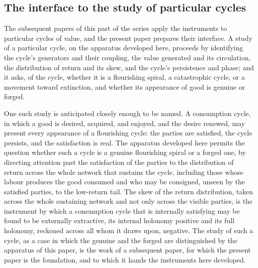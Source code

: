 \subsection{The interface to the study of particular cycles}
\label{p11:sec:found-interface}

The subsequent papers of this part of the series apply the instruments to particular cycles of value, and the present paper prepares their interface. A study of a particular cycle, on the apparatus developed here, proceeds by identifying the cycle's generators and their coupling, the value generated and its circulation, the distribution of return and its skew, and the cycle's persistence and phase; and it asks, of the cycle, whether it is a flourishing spiral, a catastrophic cycle, or a movement toward extinction, and whether its appearance of good is genuine or forged.

One such study is anticipated closely enough to be named. A consumption cycle, in which a good is desired, acquired, and enjoyed, and the desire renewed, may present every appearance of a flourishing cycle: the parties are satisfied, the cycle persists, and the satisfaction is real. The apparatus developed here permits the question whether such a cycle is a genuine flourishing spiral or a forged one, by directing attention past the satisfaction of the parties to the distribution of return across the whole network that sustains the cycle, including those whose labour produces the good consumed and who may be consigned, unseen by the satisfied parties, to the low-return tail. The skew of the return distribution, taken across the whole sustaining network and not only across the visible parties, is the instrument by which a consumption cycle that is internally satisfying may be found to be externally extractive, its internal holonomy positive and its full holonomy, reckoned across all whom it draws upon, negative. The study of such a cycle, as a case in which the genuine and the forged are distinguished by the apparatus of this paper, is the work of a subsequent paper, for which the present paper is the foundation, and to which it hands the instruments here developed.
